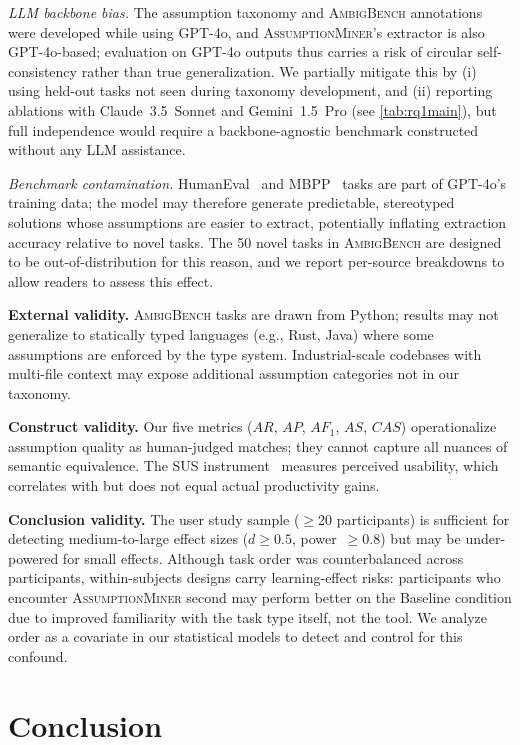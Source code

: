 \documentclass[sigconf,review,anonymous]{acmart}
\newcommand{\sysname}{\textsc{AssumptionMiner}\xspace}
\newcommand{\benchname}{\textsc{AmbigBench}\xspace}
\newcommand{\NumParticipants}{$\geq$20\xspace}
\newcommand{\AR}{$\mathit{AR}$\xspace}
\newcommand{\AP}{$\mathit{AP}$\xspace}
\newcommand{\AFone}{$\mathit{AF_1}$\xspace}
\newcommand{\AS}{$\mathit{AS}$\xspace}
\newcommand{\CAS}{$\mathit{CAS}$\xspace}
\begin{document}
\emph{LLM backbone bias.}
The assumption taxonomy and \benchname annotations were developed while using
GPT-4o, and \sysname's extractor is also GPT-4o-based; evaluation on GPT-4o
outputs thus carries a risk of circular self-consistency rather than true
generalization.
We partially mitigate this by (i) using held-out tasks not seen during taxonomy
development, and (ii) reporting ablations with Claude~3.5~Sonnet and
Gemini~1.5~Pro (see \cref{tab:rq1main}), but full independence would require
a backbone-agnostic benchmark constructed without any LLM assistance.

\emph{Benchmark contamination.}
HumanEval~\cite{chen2021codex} and MBPP~\cite{austin2021mbpp} tasks are part
of GPT-4o's training data; the model may therefore generate predictable,
stereotyped solutions whose assumptions are easier to extract, potentially
inflating extraction accuracy relative to novel tasks.
The 50 novel tasks in \benchname are designed to be out-of-distribution
for this reason, and we report per-source breakdowns to allow readers to assess
this effect.

\textbf{External validity.}
\benchname tasks are drawn from Python; results may not generalize to statically
typed languages (e.g., Rust, Java) where some assumptions are enforced by the
type system.  Industrial-scale codebases with multi-file context may expose
additional assumption categories not in our taxonomy.

\textbf{Construct validity.}
Our five metrics (\AR, \AP, \AFone, \AS, \CAS) operationalize assumption quality
as human-judged matches; they cannot capture all nuances of semantic equivalence.
The SUS instrument~\cite{brooke1996sus} measures perceived usability, which
correlates with but does not equal actual productivity gains.

\textbf{Conclusion validity.}
The user study sample (\NumParticipants participants) is sufficient for detecting
medium-to-large effect sizes ($d \geq 0.5$, power~$\geq 0.8$) but may be
under-powered for small effects.
Although task order was counterbalanced across participants, within-subjects
designs carry learning-effect risks: participants who encounter \sysname second
may perform better on the Baseline condition due to improved familiarity with
the task type itself, not the tool.
We analyze order as a covariate in our statistical models to detect and control
for this confound.

\section{Conclusion}
\label{sec:conclusion}
\end{document}
